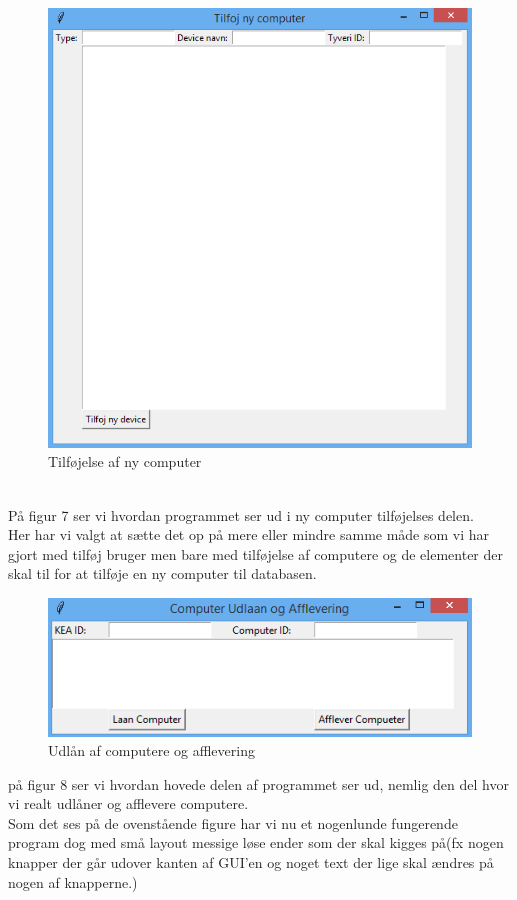 \documentclass[a4paper]{article}
\begin{document}
\begin{figure}[h!]
\centering
\includegraphics[width=1\textwidth]{Tilfojcomputer.png}
\caption{Tilføjelse af ny computer}
\end{figure}
\\
På figur 7 ser vi hvordan programmet ser ud i ny computer tilføjelses delen.\\
Her har vi valgt at sætte det op på mere eller mindre samme måde som vi har gjort med tilføj bruger men bare med tilføjelse af computere og de elementer der skal til for at tilføje en ny computer til databasen.
\pagebreak
\begin{figure}[h!]
\centering
\includegraphics[width=1\textwidth]{Udlan.png}
\caption{Udlån af computere og afflevering}
\end{figure}
på figur 8 ser vi hvordan hovede delen af programmet ser ud, nemlig den del hvor vi realt udlåner og afflevere computere.
\\[0.1in]
Som det ses på de ovenstående figure har vi nu et nogenlunde fungerende program dog med små layout messige løse ender som der skal kigges på(fx nogen knapper der går udover kanten af GUI'en og noget text der lige skal ændres på nogen af knapperne.)
\pagebreak
\end{document}
